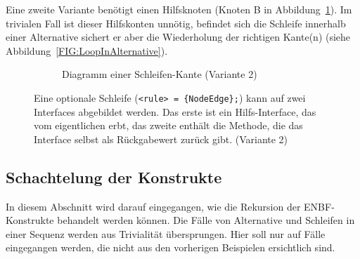 \documentclass[../InterneDSLs.tex]{subfiles}
\begin{document}
Eine zweite Variante benötigt einen Hilfsknoten (Knoten B in Abbildung~\ref{FIG:DiagramLoopNodeAlt}). Im trivialen Fall ist dieser Hilfskonten unnötig, befindet sich die Schleife innerhalb einer Alternative sichert er aber die Wiederholung der richtigen Kante(n) (siehe Abbildung~\ref{FIG:LoopInAlternative}).
\begin{figure}[ht]
\centering
  \begin{subfigure}[c]{0.49\textwidth}
    \caption{Diagramm einer Schleifen-Kante (Variante 2)}
    \label{FIG:DiagramLoopNodeAlt}
  \end{subfigure}
  \begin{subfigure}[c]{0.49\textwidth}
    
  \end{subfigure}
  \caption[Abbildung einer optionalen Schleife (Variante 2)]{Eine optionale Schleife (\texttt{<rule> = \{NodeEdge\};}) kann auf zwei Interfaces abgebildet werden. Das erste ist ein Hilfs-Interface, das vom eigentlichen erbt, das zweite enthält die Methode, die das Interface selbst als Rückgabewert zurück gibt. (Variante 2)}
  \label{FIG:LoopNodeAlt}
\end{figure}


\subsection{Schachtelung der Konstrukte}
In diesem Abschnitt wird darauf eingegangen, wie die Rekursion der ENBF-Konstrukte behandelt werden können. Die Fälle von Alternative und Schleifen in einer Sequenz werden aus Trivialität übersprungen. Hier soll nur auf Fälle eingegangen werden, die nicht aus den vorherigen Beispielen ersichtlich sind.
\end{document}

